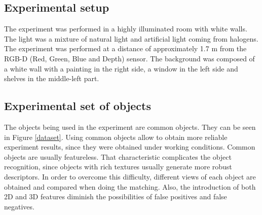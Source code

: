 



	\subsection{Experimental setup}
	\label{setup}
	The experiment was performed in a highly illuminated room with white walls. 
	The light was a mixture of natural light and artificial light coming from halogens.
	The experiment was performed at a distance of approximately 1.7 m from the RGB-D (Red, Green, Blue and Depth) sensor. 
	The background was composed of a white wall with a painting in the right side, a window in the left side and shelves in the middle-left part. 



	\subsection{Experimental set of objects}
	\label{set_of_objects}
		The objects being used in the experiment are common objects. 
		They can be seen in Figure \ref{dataset}.
		Using common objects allow to obtain more reliable experiment results, since they were obtained under working conditions. 
		Common objects are usually featureless. 
		That characteristic complicates the object recognition, since objects with rich textures usually generate more robust descriptors.
		In order to overcome this difficulty, different views of each object are obtained and compared when doing the matching. 
		Also, the introduction of both 2D and 3D features diminish the possibilities of false positives and false negatives. 

